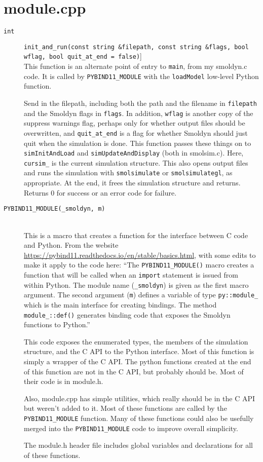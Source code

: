\documentclass {scrbook}
\newcommand {\ttt} {\texttt}
\begin{document}
\section{module.cpp}

\begin{description}

\item[\ttt{int}]
\ttt{init\_and\_run(const string \&filepath, const string \&flags, bool wflag, bool quit\_at\_end = false)}]
\hfill \\
This function is an alternate point of entry to \ttt{main}, from my smoldyn.c code. It is called by \ttt{PYBIND11\_MODULE} with the \ttt{loadModel} low-level Python function.

Send in the filepath, including both the path and the filename in \ttt{filepath} and the Smoldyn flags in \ttt{flags}. In addition, \ttt{wflag} is another copy of the suppress warnings flag, perhaps only for whether output files should be overwritten, and \ttt{quit\_at\_end} is a flag for whether Smoldyn should just quit when the simulation is done. This function passes these things on to \ttt{simInitAndLoad} and \ttt{simUpdateAndDisplay} (both in smolsim.c). Here, \ttt{cursim\_} is the current simulation structure. This also opens output files and runs the simulation with \ttt{smolsimulate} or \ttt{smolsimulategl}, as appropriate. At the end, it frees the simulation structure and returns. Returns 0 for success or an error code for failure.

\item[\ttt{PYBIND11\_MODULE(\_smoldyn, m)}]
\hfill \\
This is a macro that creates a function for the interface between C code and Python. From the website \url{https://pybind11.readthedocs.io/en/stable/basics.html}, with some edits to make it apply to the code here: ``The \ttt{PYBIND11\_MODULE()} macro creates a function that will be called when an \ttt{import} statement is issued from within Python. The module name (\ttt{\_smoldyn}) is given as the first macro argument. The second argument (\ttt{m}) defines a variable of type \ttt{py::module\_} which is the main interface for creating bindings. The method \ttt{module\_::def()} generates binding code that exposes the Smoldyn functions to Python.''

This code exposes the enumerated types, the members of the simulation
structure, and the C API to the Python interface. Most of this function is
simply a wrapper of the C API. The python functions created at the end of this
function are not in the C API, but probably should be. Most of their code is in
module.h.

Also, module.cpp has simple utilities, which really should be in the C API but weren't added to it. Most of these functions are called by the \ttt{PYBIND11\_MODULE} function. Many of these functions could also be usefully merged into the \ttt{PYBIND11\_MODULE} code to improve overall simplicity.

The module.h header file includes global variables and declarations for all of these functions. 

\end{description}
\end{document}
